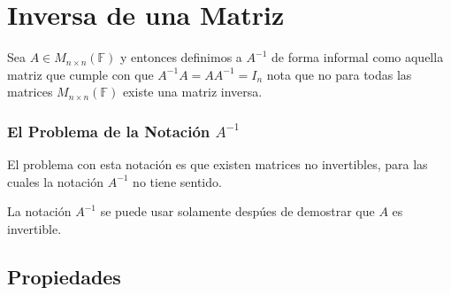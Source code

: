 \documentclass[12pt]{report}                                    %
\begin{document}
        \clearpage
        \section{Inversa de una Matriz}

            Sea $A \in M_{n \times n}(\mathbb{F})$ y entonces definimos a $A^{-1}$ 
            de forma informal como aquella matriz que cumple con que $A^{-1}A = AA^{-1} = I_{n}$
            nota que no para todas las matrices $M_{n \times n}(\mathbb{F})$ existe una matriz inversa.


           \subsubsection*{El Problema de la Notación $A^{-1}$}

           El problema con esta notación es que existen matrices no invertibles, para las cuales
           la notación $A^{-1}$ no tiene sentido.

           La notación $A^{-1}$ se puede usar solamente despúes de demostrar que $A$ es invertible.

            \clearpage
            \subsection{Propiedades}
\end{document}
